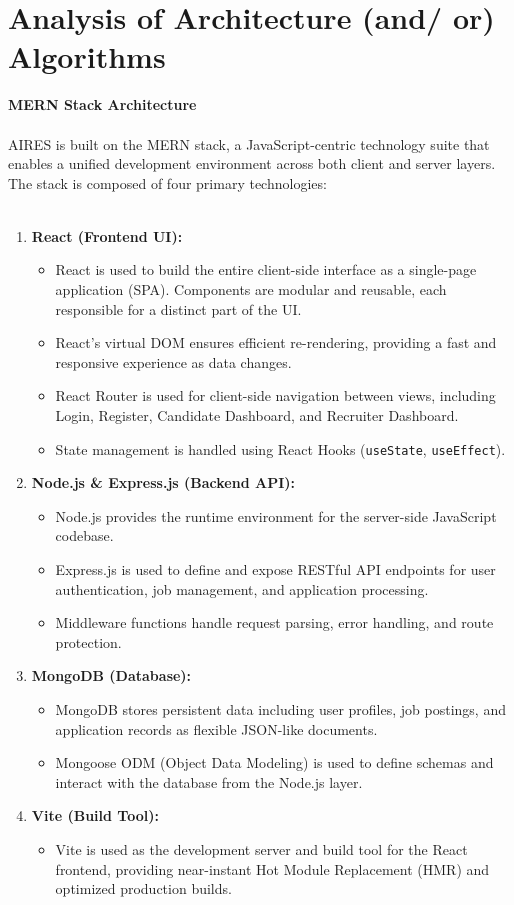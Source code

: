 \section{Analysis of Architecture (and/ or) Algorithms}
{\large \textbf{MERN Stack Architecture}}\\\\
AIRES is built on the MERN stack, a JavaScript-centric technology suite that enables a unified development environment across both client and server layers. The stack is composed of four primary technologies:\\\\
\begin{enumerate}
    \item \textbf{React (Frontend UI):}
    \begin{itemize}
        \item React is used to build the entire client-side interface as a single-page application (SPA). Components are modular and reusable, each responsible for a distinct part of the UI.
        \item React's virtual DOM ensures efficient re-rendering, providing a fast and responsive experience as data changes.
        \item React Router is used for client-side navigation between views, including Login, Register, Candidate Dashboard, and Recruiter Dashboard.
        \item State management is handled using React Hooks (\texttt{useState}, \texttt{useEffect}).
    \end{itemize}
    \item \textbf{Node.js \& Express.js (Backend API):}
    \begin{itemize}
        \item Node.js provides the runtime environment for the server-side JavaScript codebase.
        \item Express.js is used to define and expose RESTful API endpoints for user authentication, job management, and application processing.
        \item Middleware functions handle request parsing, error handling, and route protection.
    \end{itemize}
    \item \textbf{MongoDB (Database):}
    \begin{itemize}
        \item MongoDB stores persistent data including user profiles, job postings, and application records as flexible JSON-like documents.
        \item Mongoose ODM (Object Data Modeling) is used to define schemas and interact with the database from the Node.js layer.
    \end{itemize}
    \item \textbf{Vite (Build Tool):}
    \begin{itemize}
        \item Vite is used as the development server and build tool for the React frontend, providing near-instant Hot Module Replacement (HMR) and optimized production builds.
    \end{itemize}
\end{enumerate}
